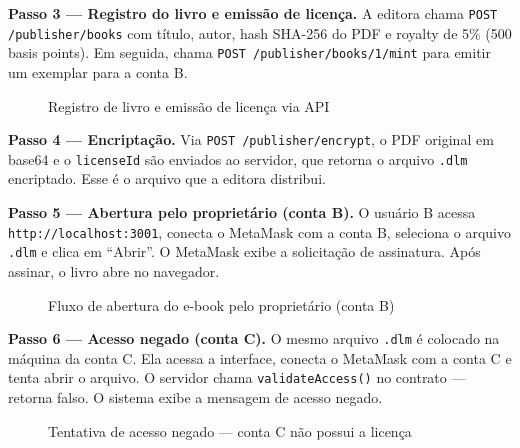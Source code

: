 \documentclass[12pt]{article}
\begin{document}
\textbf{Passo 3 — Registro do livro e emissão de licença.} A editora chama \texttt{POST /publisher/books} com título, autor, hash SHA-256 do PDF e royalty de 5\% (500 basis points). Em seguida, chama \texttt{POST /publisher/books/1/mint} para emitir um exemplar para a conta B.

\begin{figure}[H]
\centering
\caption{Registro de livro e emissão de licença via API}
\label{fig:mint}
\end{figure}

\textbf{Passo 4 — Encriptação.} Via \texttt{POST /publisher/encrypt}, o PDF original em base64 e o \texttt{licenseId} são enviados ao servidor, que retorna o arquivo \texttt{.dlm} encriptado. Esse é o arquivo que a editora distribui.

\textbf{Passo 5 — Abertura pelo proprietário (conta B).} O usuário B acessa \texttt{http://localhost:3001}, conecta o MetaMask com a conta B, seleciona o arquivo \texttt{.dlm} e clica em ``Abrir''. O MetaMask exibe a solicitação de assinatura. Após assinar, o livro abre no navegador.

\begin{figure}[H]
\centering
\caption{Fluxo de abertura do e-book pelo proprietário (conta B)}
\label{fig:abertura}
\end{figure}

\textbf{Passo 6 — Acesso negado (conta C).} O mesmo arquivo \texttt{.dlm} é colocado na máquina da conta C. Ela acessa a interface, conecta o MetaMask com a conta C e tenta abrir o arquivo. O servidor chama \texttt{validateAccess()} no contrato — retorna falso. O sistema exibe a mensagem de acesso negado.

\begin{figure}[H]
\centering
\caption{Tentativa de acesso negado — conta C não possui a licença}
\label{fig:negado}
\end{figure}
\end{document}
